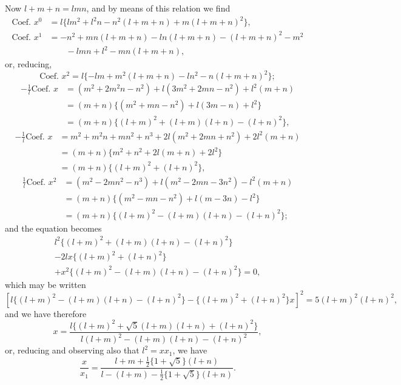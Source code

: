 \documentclass[11pt,a4paper]{article}
\theoremstyle{plain}
\begin{document}
Now $l + m + n = lmn$, and by means of this relation we find
\begin{align*}
\text{Coef. }x^0 &= l\{lm^2 + l^2n - n^2(l + m + n) + m(l + m + n)^2\},\\
\text{Coef. }x^1 &= -n^2 + mn(l + m + n) - ln(l + m + n) - (l + m + n)^2 - m^2\\
&\qquad - lmn + l^2 - mn(l + m + n),
\end{align*}
or, reducing,
\[
\text{Coef. }x^2 = l\{-lm + m^2(l + m + n) - ln^2 - n(l + m + n)^2\};
\]
\begin{align*}
-\tfrac{1}{l}\text{Coef. }x &= (m^2 + 2m^2n - n^2) + l(3m^2 + 2mn - n^2) + l^2(m + n)\\
&= (m + n)\{(m^2 + mn - n^2) + l(3m - n) + l^2\}\\
&= (m + n)\{(l + m)^2 + (l + m)(l + n) - (l + n)^2\},
\end{align*}
\begin{align*}
-\tfrac{1}{l}\text{Coef. }x &= m^2 + m^2n + mn^2 + n^3 + 2l(m^2 + 2mn + n^2) + 2l^2(m + n)\\
&= (m + n)\{m^2 + n^2 + 2l(m + n) + 2l^2\}\\
&= (m + n)\{(l + m)^2 + (l + n)^2\},
\end{align*}
\begin{align*}
\tfrac{1}{l}\text{Coef. }x^2 &= (m^2 - 2mn^2 - n^3) + l(m^2 - 2mn - 3n^2) - l^2(m + n)\\
&= (m + n)\{(m^2 - mn - n^2) + l(m - 3n) - l^2\}\\
&= (m + n)\{(l + m)^2 - (l + m)(l + n) - (l + n)^2\};
\end{align*}
and the equation becomes
\begin{multline*}
l^2\{(l + m)^2 + (l + m)(l + n) - (l + n)^2\}\\
- 2lx\{(l + m)^2 + (l + n)^2\}\\
+ x^2\{(l + m)^2 - (l + m)(l + n) - (l + n)^2\} = 0,
\end{multline*}
which may be written
\[
[l\{(l + m)^2 - (l + m)(l + n) - (l + n)^2\} - \{(l + m)^2 + (l + n)^2\}x]^2 = 5(l + m)^2(l + n)^2,
\]
and we have therefore
\[
x = \frac{l\{(l + m)^2 + \sqrt{5}(l + m)(l + n) + (l + n)^2\}}{l(l + m)^2 - (l + m)(l + n) - (l + n)^2},
\]
or, reducing and observing also that $l^2 = xx_1$, we have
\[
\frac{x}{x_1} = \frac{l + m + \tfrac{1}{2}\{1 + \sqrt{5}\}(l + n)}{l - (l + m) - \tfrac{1}{2}\{1 + \sqrt{5}\}(l + n)}.
\]
\end{document}
